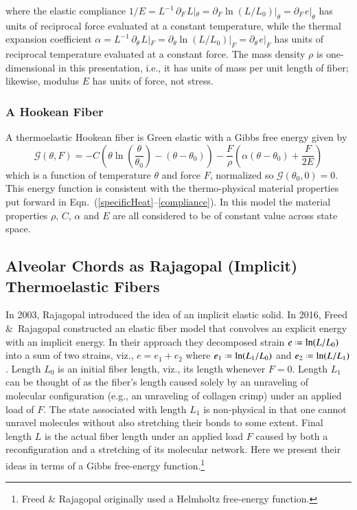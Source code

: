 where the elastic compliance $1/E = L^{-1} \, \partial_{F\,} L |_{\theta } = \partial_{F} \ln (L / L_0) |_{\theta } = \partial_{F\,} e |_{\theta }$ has units of reciprocal force evaluated at a constant temperature, while the thermal expansion coefficient $\alpha = L^{-1} \, \partial_{\theta\,} L |_F = \partial_{\theta} \ln (L/L_0) |_F = \partial_{\theta\,} e |_F$ has units of reciprocal temperature evaluated at a constant force.  The mass density $\rho$ is one-dimensional in this presentation, i.e., it has units of mass per unit length of fiber; likewise, modulus $E$ has units of force, not stress.

\subsubsection{A Hookean Fiber}

A thermoelastic Hookean fiber is Green elastic with a Gibbs free energy given by
\begin{equation}
    \mathcal{G} (\theta , F) = -C \left( \theta \ln \left( \frac{\theta}{\theta_0} \right) - 
    (\theta - \theta_0) \right) - 
    \frac{F}{\rho} \left( \alpha ( \theta - \theta_0 ) + \frac{F}{2E} \right)
    \label{GreenEnergy}
\end{equation}
which is a function of temperature $\theta$ and force $F$, normalized so $\mathcal{G} (\theta_0 , 0) = 0$.  This energy function is consistent with the thermo-physical material properties put forward in Eqn.~(\ref{specificHeat}--\ref{compliance}).  In this model the material properties $\rho$, $C$, $\alpha$ and $E$ are all considered to be of constant value across state space.

\subsection{Alveolar Chords as Rajagopal (Implicit) Thermoelastic Fibers}

In 2003, Rajagopal \cite{Rajagopal03} introduced the idea of an implicit elastic solid.  In 2016, Freed \&\ Rajagopal \cite{FreedRajagopal16} constructed an elastic fiber model that convolves an explicit energy with an implicit energy.  In their approach they decomposed strain $e \defeq \ln (L / L_0)$ into a sum of two strains, viz., $e = e_1 + e_2$ where $e_1 \defeq \ln (L_1 / L_0)$ and $e_2 \defeq \ln (L / L_1)$.  Length $L_0$ is an initial fiber length, viz., its length whenever $F = 0$.  Length $L_1$ can be thought of as the fiber's length caused solely by an unraveling of molecular configuration (e.g., an unraveling of collagen crimp) under an applied load of $F$.  The state associated with length $L_1$ is non-physical in that one cannot unravel molecules without also stretching their bonds to some extent.  Final length $L$ is the actual fiber length under an applied load $F$ caused by both a reconfiguration and a stretching of its molecular network.  Here we present their ideas in terms of a Gibbs free-energy function.\footnote{%
    Freed \& Rajagopal \cite{FreedRajagopal16} originally used a Helmholtz free-energy function.
}


